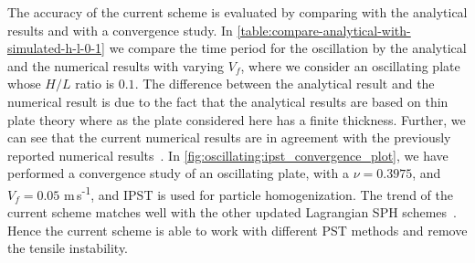 \documentclass[preprint,12pt]{elsarticle}
\begin{document}
The accuracy of the current scheme is evaluated by comparing with the
analytical results and with a convergence study. In
\cref{table:compare-analytical-with-simulated-h-l-0-1} we compare the time
period for the oscillation by the analytical and the numerical results with
varying $V_f$, where we consider an oscillating plate whose $H/L$ ratio is
$0.1$. The difference between the analytical result and the numerical result
is due to the fact that the analytical results are based on thin plate theory
where as the plate considered here has a finite thickness. Further, we can see
that the current numerical results are in agreement with the previously
reported numerical results~\cite{gray-ed-2001, zhang_hu_adams17}. In
\cref{fig:oscillating:ipst_convergence_plot}, we have performed a convergence
study of an oscillating plate, with a $\nu=0.3975$, and $V_f=0.05$
m\,s\textsuperscript{-1}, and IPST is used for particle homogenization. The trend of
the current scheme matches well with the other updated Lagrangian SPH
schemes~\cite{gray-ed-2001, zhang_hu_adams17}. Hence the current scheme is
able to work with different PST methods and remove the tensile instability.
\end{document}
